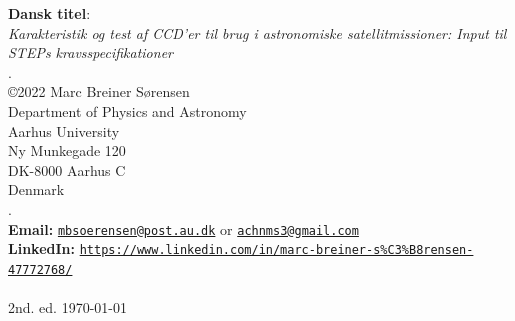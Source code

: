 \documentclass[12pt, a4paper, twoside, article]{memoir}
\begin{document}
	\clearpage 
	\thispagestyle{empty}
	\vspace*{5cm}
	\noindent \textbf{Dansk titel}: \\ \textit{Karakteristik og test af CCD'er til brug i astronomiske satellitmissioner: Input til STEPs kravsspecifikationer}\\
	\noindent  \color{white}.\\ \color{black}
	\noindent\copyright 2022 Marc Breiner Sørensen\\
	\noindent Department of Physics and Astronomy\\
	\noindent Aarhus University\\
	\noindent Ny Munkegade 120\\
	\noindent DK-8000 Aarhus C\\
	\noindent Denmark\\
	\noindent  \color{white}.\\ \color{black}
	\noindent \textbf{Email:} \texttt{\url{mbsoerensen@post.au.dk}} or \texttt{\url{achnms3@gmail.com}}\\
	\noindent \textbf{LinkedIn:} \texttt{\url{https://www.linkedin.com/in/marc-breiner-s\%C3\%B8rensen-47772768/}}\\\\
	\noindent 2nd. ed. \today
	
	\clearpage
	\tableofcontents
	\thispagestyle{empty}
	
	\clearpage
	
	
	
	\clearpage
	
	
	\clearpage
	\thispagestyle{empty}
	\mbox{}
	\clearpage
	
	
	\clearpage
	
	\clearpage
	\thispagestyle{empty}
	\mbox{}
	\clearpage
	
	
	\clearpage
	\thispagestyle{empty}
	\mbox{}
	\clearpage
	
	
	\clearpage
	
	
	\clearpage
	
	\clearpage
	
	
\end{document}
